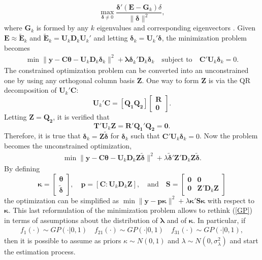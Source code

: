 \documentclass{article}\usepackage[]{graphicx}\usepackage[]{color}
\begin{document}
\[ \max_{\mathbf{\delta} \ne 0} \frac{\mathbf{\delta} '(\mathbf{E} - \mathbf{G}_k) \delta}{\| \mathbf{\delta} \| ^2}, \]
where $\mathbf{G}_k$ is formed by any $k$ eigenvalues and corresponding eigenvectors \cite{wood2003thin}. Given $\mathbf{E} \approx \tilde{\mathbf{E}}_k$ and $\tilde{\mathbf{E}}_k = \mathbf{U}_k \mathbf{D}_k \mathbf{U}_k'$ and letting $\mathbf{\delta}_k= \mathbf{U}_k' \mathbf{\delta}$, the minimization problem becomes
\begin{align*}
\min \| \mathbf{\mathbf{y} -C \theta} - \mathbf{U}_k \mathbf{D}_k \mathbf{\delta}_k \|^2 + \mathbf{\lambda \delta}_k' \mathbf{D}_k \mathbf{\delta}_k \quad \text{subject to} \quad \mathbf{C' U}_k \mathbf{\delta}_k= 0. 
\end{align*}
The constrained optimization problem can be converted into an unconstrained one by using any orthogonal column basis $\mathbf{Z} $. One way to form $\mathbf{Z} $ is via the QR decomposition of $\mathbf{U}_k' \mathbf{C} $:
\[ \mathbf{U}_k' \mathbf{C} = [\mathbf{Q_1 Q_2}] \left[\begin{matrix} \mathbf{R} \\ \mathbf{0} \end{matrix}\right]. \]
Letting $\mathbf{Z = Q_2}$, it is verified that
\[ \mathbf{T' U}_k \mathbf{Z = R' Q_1' Q_2 = 0.} \]
Therefore, it is true that $\mathbf{\delta}_k= \mathbf{Z \tilde{\delta}}$ for $\mathbf{\delta}_k$ such that $\mathbf{C' U}_k \mathbf{\delta}_k = 0$. Now the problem becomes the unconstrained optimization,
\begin{align*}
\min \| \mathbf{\mathbf{y} -C \theta} - \mathbf{U}_k \mathbf{D}_k \mathbf{Z \tilde{\delta}}\|^2+ \lambda \mathbf{\tilde{\delta}' Z'} \mathbf{D}_k \mathbf{Z \tilde{\delta}}.
\end{align*}
By defining
\[ \mathbf{\kappa} = \left[\begin{matrix} \mathbf{\theta} \\ \mathbf{\tilde{\delta}} \end{matrix}\right], \quad \mathbf{\mathbf{p}} = [\mathbf{C : U}_k \mathbf{D}_k \mathbf{Z}], \quad \text {and} \quad \mathbf{S} = \left[\begin{matrix} \mathbf{0} & \mathbf{0} \\ \mathbf{0} & \mathbf{Z' D}_k \mathbf{Z} \end{matrix}\right] \]
the optimization can be simplified as $ \min \| \mathbf{y - p \kappa} \| ^2 + \lambda \mathbf{\kappa' S \kappa} $ with respect to $\mathbf{\kappa}$. This last reformulation of the minimization problem allows to rethink (\ref{GP}) in terms of assumptions about the distribution of $ \mathbf{\lambda} $ and of $ \mathbf{\kappa} $. In particular, if 
\begin{align}\label{GP_1}
f_1(\cdot) \sim GP(\cdot | 0, 1) \quad f_{21}(\cdot) \sim GP(\cdot | 0, 1) \quad f_{31}(\cdot) \sim GP(\cdot | 0, 1),
\end{align}
then it is possible to assume as priors $ \kappa \sim N(0,1) $ and $ \lambda \sim N(0,\sigma_{\lambda}^{2}) $ and start the estimation process.
\end{document}
